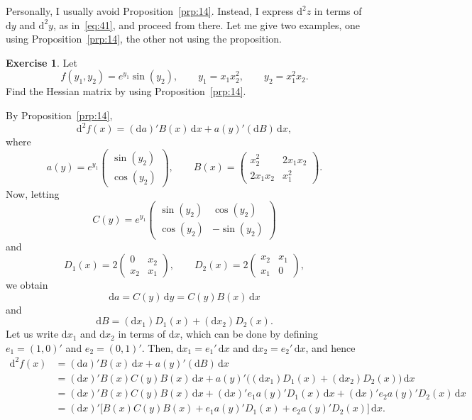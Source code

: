 \documentclass[12pt,a4paper]{article}
\makeatletter
\theoremstyle{definition}
\newtheorem{exercise}{Exercise}
\renewenvironment{proof}[1][\proofname]{\par
  \pushQED{\qed}%
  \normalfont \topsep6\p@\@plus6\p@\relax
  \trivlist
  \item[\hskip\labelsep\bfseries #1\@addpunct{.}]\ignorespaces
}{%
  \popQED\endtrivlist\@endpefalse
}
\newenvironment{solution}{%
  \begin{proof}[Solution]%
}{%
  \end{proof}%
}
\newcommand{\dd}{\mathrm{d}}
\makeatother
\begin{document}
Personally, I usually avoid Proposition~\ref{prp:14}. Instead, I express $\dd^2 z$ in terms of $\dd y$ and $\dd^2 y$, as in~\eqref{eq:41}, and proceed from there. Let me give two examples, one using Proposition~\ref{prp:14}, the other not using the proposition. %

\begin{exercise}\label{exer:26}
Let
\[
f(y_1, y_2) = e^{y_1} \sin(y_2), \qquad y_1 = x_1 x_2^2, \qquad y_2 = x_1^2 x_2.
\]
Find the Hessian matrix by using Proposition~\ref{prp:14}.
\end{exercise}

\begin{solution}
By Proposition~\ref{prp:14},
\[
\dd^2 f(x) = (\dd a)' B(x)\, \dd x + a(y)'(\dd B)\, \dd x,
\]
where
\[
a(y) = e^{y_1} \begin{pmatrix} \sin(y_2) \\ \cos(y_2) \end{pmatrix}, \qquad
B(x) = \begin{pmatrix} x_2^2 & 2x_1 x_2 \\ 2x_1 x_2 & x_1^2 \end{pmatrix}.
\]
Now, letting
\[
C(y) = e^{y_1} \begin{pmatrix} \sin(y_2) & \cos(y_2) \\ \cos(y_2) & -\sin(y_2) \end{pmatrix}
\]
and
\[
D_1(x) = 2\begin{pmatrix} 0 & x_2 \\ x_2 & x_1 \end{pmatrix}, \qquad
D_2(x) = 2\begin{pmatrix} x_2 & x_1 \\ x_1 & 0 \end{pmatrix},
\]
we obtain
\[
\dd a = C(y)\, \dd y = C(y) B(x)\, \dd x
\]
and
\[
\dd B = (\dd x_1) D_1(x) + (\dd x_2) D_2(x).
\]
Let us write $\dd x_1$ and $\dd x_2$ in terms of $\dd x$, which can be done by defining $e_1 = (1, 0)'$ and $e_2 = (0, 1)'$. Then, $\dd x_1 = e_1'\, \dd x$ and $\dd x_2 = e_2'\, \dd x$, and hence
\begin{align*}
\dd^2 f(x) &= (\dd a)' B(x)\, \dd x + a(y)'(\dd B)\, \dd x \\
&= (\dd x)' B(x) C(y) B(x)\, \dd x + a(y)'\bigl((\dd x_1) D_1(x) + (\dd x_2) D_2(x)\bigr)\, \dd x \\
&= (\dd x)' B(x) C(y) B(x)\, \dd x + (\dd x)' e_1 a(y)' D_1(x)\, \dd x + (\dd x)' e_2 a(y)' D_2(x)\, \dd x \\
&= (\dd x)'\bigl[B(x) C(y) B(x) + e_1 a(y)' D_1(x) + e_2 a(y)' D_2(x)\bigr]\, \dd x.

\end{align*}
\end{solution}
\end{document}
